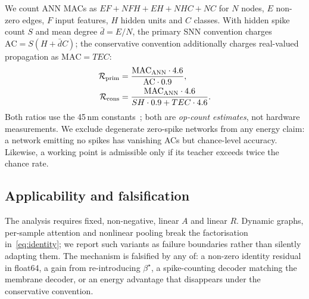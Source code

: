 We count ANN MACs as $EF + NFH + EH + NHC + NC$ for $N$ nodes, $E$ non-zero edges, $F$ input features, $H$ hidden units and $C$ classes. With hidden spike count $S$ and mean degree $\bar d = E/N$, the primary SNN convention charges
$\mathrm{AC} = S (H + \bar d C)$;
the conservative convention additionally charges real-valued propagation as $\mathrm{MAC}=T E C$:
\begin{align}
\mathcal{R}_{\mathrm{prim}} &= \frac{\mathrm{MAC}_{\mathrm{ANN}}\cdot4.6}{\mathrm{AC}\cdot0.9},
\label{eq:energy}\\
\mathcal{R}_{\mathrm{cons}} &= \frac{\mathrm{MAC}_{\mathrm{ANN}}\cdot4.6}{S H\cdot0.9 + T E C\cdot4.6}.
\notag
\end{align}
Both ratios use the 45\,nm constants~\cite{horowitz2014}; both are \emph{op-count estimates}, not hardware measurements. We exclude degenerate zero-spike networks from any energy claim: a network emitting no spikes has vanishing ACs but chance-level accuracy. Likewise, a working point is admissible only if its teacher exceeds twice the chance rate.

\subsection{Applicability and falsification}
\label{ssec:scope}

The analysis requires fixed, non-negative, linear $A$ and linear $R$. Dynamic graphs, per-sample attention and nonlinear pooling break the factorisation in~\eqref{eq:identity}; we report such variants as failure boundaries rather than silently adapting them. The mechanism is falsified by any of: a non-zero identity residual in float64, a gain from re-introducing $\beta^\star$, a spike-counting decoder matching the membrane decoder, or an energy advantage that disappears under the conservative convention.
